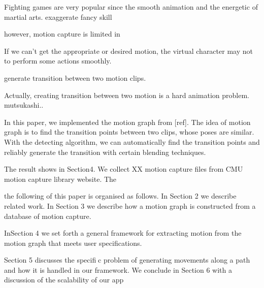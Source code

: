 Fighting games are very popular since the smooth animation and the energetic of martial arts. 
exaggerate  fancy skill


however, motion capture is limited in 

If we can't get the appropriate or desired motion, the virtual character may not 
to perform some actions smoothly.


generate transition between two motion clips. 

Actually, creating transition between two motion is a hard animation problem.
mutsukashi..



In this paper, we implemented the motion graph from [ref].
The idea of motion graph is to find the transition points between two clips, 
whose poses are similar. 
With the detecting algorithm, we can automatically find the transition points 
and reliably generate the transition with certain blending techniques.


The result shows in Section4. We collect XX motion capture files from CMU motion 
capture library website. The 


the following of this paper is organised  as follows.
In Section 2 we describe related work. In Section 3 we describe how a motion
graph is constructed from a database of motion capture. 

InSection 4 we set forth a general framework for extracting motion from the
motion graph that meets user specifications. 

Section 5 discusses the specific problem of generating movements along a path and how
it is handled in our framework. We conclude in Section 6 with a
discussion of the scalability of our app
